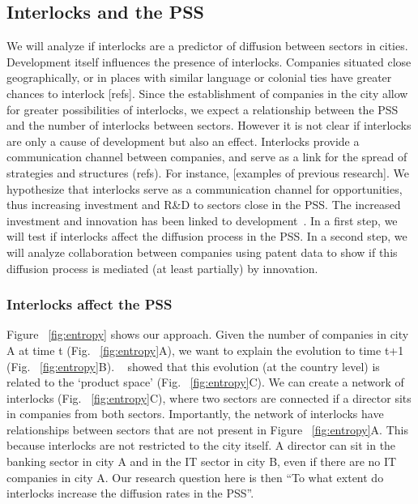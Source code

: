 \subsection{Interlocks and the PSS}
We will analyze if interlocks are a predictor of diffusion between sectors in cities. 
Development itself influences the presence of interlocks.
Companies situated close geographically, or in places with similar language or colonial ties 
have greater chances to interlock [refs].
Since the establishment of companies in the city allow for greater possibilities of interlocks,
we expect a relationship between the PSS and the number of interlocks between sectors.
However it is not clear if interlocks are only a cause of development but also an effect.
Interlocks provide a communication channel between companies, 
and serve as a link for the spread of strategies and structures (refs).
For instance, [examples of previous research].
We hypothesize that interlocks serve as a communication channel for opportunities,
thus increasing investment and R\&D to sectors close in the PSS.
The increased investment and innovation has been linked to development~\citep{Romer1991,grossman1991,hidalgo2007}.
In a first step, we will test if interlocks affect the diffusion process in the PSS.
In a second step, we will analyze collaboration between companies using patent data to show if this diffusion process is mediated (at least partially) by innovation.

\subsubsection{Interlocks affect the PSS}
\label{sec:interlockspss}
Figure ~\ref{fig:entropy} shows our approach. 
Given the number of companies in city A at time t (Fig. ~\ref{fig:entropy}A), 
we want to explain the evolution to time t+1 (Fig. ~\ref{fig:entropy}B).
~\cite{hidalgo2009} showed that this evolution (at the country level) is related to the `product space' (Fig. ~\ref{fig:entropy}C).
We can create a network of interlocks (Fig. ~\ref{fig:entropy}C),
where two sectors are connected if a director sits in companies from both sectors.
Importantly, the network of interlocks have relationships between sectors that are not present in Figure ~\ref{fig:entropy}A. 
This because interlocks are not restricted to the city itself.
A director can sit in the banking sector in city A and in the IT sector in city B, even if there are no IT companies in city A.
Our research question here is then ``To what extent do interlocks increase the diffusion rates in the PSS''.


